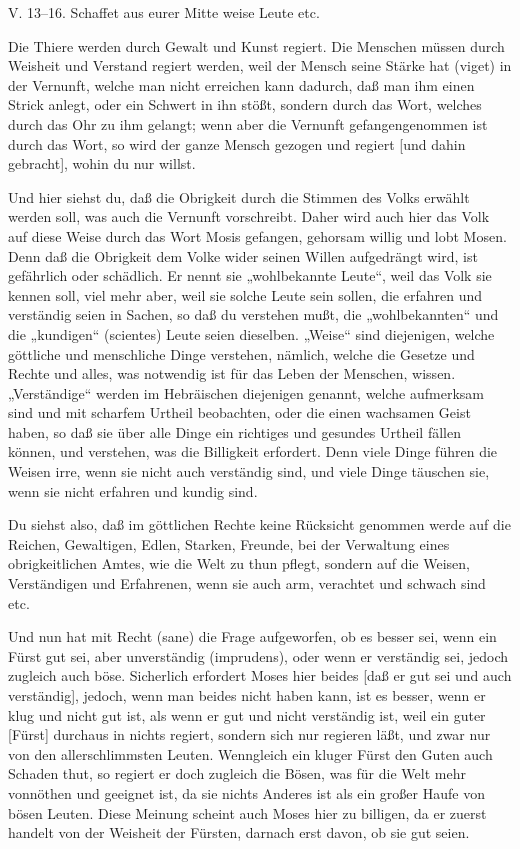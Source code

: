 \begin{schriftzitat}
V. 13–16. Schaffet aus eurer Mitte weise Leute etc.
\end{schriftzitat}

Die Thiere werden durch Gewalt und Kunst regiert. Die Menschen müssen durch Weisheit und Verstand regiert werden, weil der Mensch seine Stärke hat (viget) in der Vernunft, welche man nicht erreichen kann dadurch, daß man ihm einen Strick anlegt, oder ein Schwert in ihn stößt, sondern durch das Wort, welches durch das Ohr zu ihm gelangt; wenn aber die Vernunft gefangengenommen ist durch das Wort, so wird der ganze Mensch gezogen und regiert [und dahin gebracht], wohin du nur willst.

Und hier siehst du, daß die Obrigkeit durch die Stimmen des Volks erwählt werden soll, was auch die Vernunft vorschreibt. Daher wird auch hier das Volk auf diese Weise durch das Wort Mosis gefangen, gehorsam willig und lobt Mosen. Denn daß die Obrigkeit dem Volke wider seinen Willen aufgedrängt wird, ist gefährlich oder schädlich. Er nennt sie „wohlbekannte Leute“, weil das Volk sie kennen soll, viel mehr aber, weil sie solche Leute sein sollen, die erfahren und verständig seien in Sachen, so daß du verstehen mußt, die „wohlbekannten“ und die „kundigen“ (scientes) Leute seien dieselben. „Weise“ sind diejenigen, welche göttliche und menschliche Dinge verstehen, nämlich, welche die Gesetze und Rechte und alles, was notwendig ist für das Leben der Menschen, wissen. „Verständige“ werden im Hebräischen diejenigen genannt, welche aufmerksam sind und mit scharfem Urtheil beobachten, oder die einen wachsamen Geist haben, so daß sie über alle Dinge ein richtiges und gesundes Urtheil fällen können, und verstehen, was die Billigkeit erfordert. Denn viele Dinge führen die Weisen irre, wenn sie nicht auch verständig sind, und viele Dinge täuschen sie, wenn sie nicht erfahren und kundig sind.

Du siehst also, daß im göttlichen Rechte keine Rücksicht genommen werde auf die Reichen, Gewaltigen, Edlen, Starken, Freunde, bei der Verwaltung eines obrigkeitlichen Amtes, wie die Welt zu thun pflegt, sondern auf die Weisen, Verständigen und Erfahrenen, wenn sie auch arm, verachtet und schwach sind etc.

Und nun hat mit Recht (sane) die Frage aufgeworfen, ob es besser sei, wenn ein Fürst gut sei, aber unverständig (imprudens), oder wenn er verständig sei, jedoch zugleich auch böse. Sicherlich erfordert Moses hier beides [daß er gut sei und auch verständig], jedoch, wenn man beides nicht haben kann, ist es besser, wenn er klug und nicht gut ist, als wenn er gut und nicht verständig ist, weil ein guter [Fürst] durchaus in nichts regiert, sondern sich nur regieren läßt, und zwar nur von den allerschlimmsten Leuten. Wenngleich ein kluger Fürst den Guten auch Schaden thut, so regiert er doch zugleich die Bösen, was für die Welt mehr vonnöthen und geeignet ist, da sie nichts Anderes ist als ein großer Haufe von bösen Leuten. Diese Meinung scheint auch Moses hier zu billigen, da er zuerst handelt von der Weisheit der Fürsten, darnach erst davon, ob sie gut seien.

